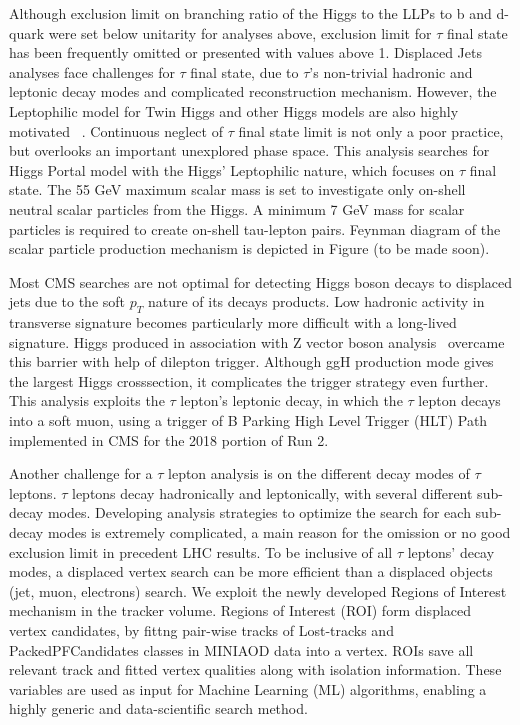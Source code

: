 Although exclusion limit on branching ratio of the Higgs to the LLPs to b and d-quark were set below unitarity for analyses above, exclusion limit for $\tau$ final state has been frequently omitted or presented with values above 1.  
Displaced Jets analyses face challenges for $\tau$ final state, due to $\tau$'s non-trivial hadronic and leptonic decay modes and complicated reconstruction mechanism. 
However, the Leptophilic model for Twin Higgs and other Higgs models are also highly motivated ~\cite{Lepto}. Continuous neglect of $\tau$ final state limit is not only a poor practice, but overlooks an important unexplored phase space. 
This analysis searches for Higgs Portal model with the Higgs' Leptophilic nature, which focuses on $\tau$ final state.
The 55 GeV maximum scalar mass is set to investigate only on-shell neutral scalar particles from the Higgs. 
A minimum 7 GeV mass for scalar particles is required to create on-shell tau-lepton pairs.
Feynman diagram of the scalar particle production mechanism is depicted in Figure (to be made soon).

Most CMS searches are not optimal for detecting Higgs boson decays to displaced jets
due to the soft $p_T$ nature of its decays products.
Low hadronic activity in transverse signature becomes particularly more difficult with a long-lived signature.
Higgs produced in association with Z vector boson analysis~\cite{ZHAN} overcame this barrier with help of dilepton trigger. 
Although ggH production mode gives the largest Higgs crosssection, it complicates the trigger strategy even further. 
This analysis exploits the $\tau$ lepton's leptonic decay, in which the $\tau$ lepton decays into a soft muon, using a trigger of B Parking High Level Trigger (HLT) Path implemented in CMS for the 2018 portion of Run 2.

Another challenge for a $\tau$ lepton analysis is on the different decay modes of $\tau$ leptons. 
$\tau$ leptons decay hadronically and leptonically, with several different sub-decay modes. 
Developing analysis strategies to optimize the search for each sub-decay modes is extremely complicated, a main reason for the omission or no good exclusion limit in precedent LHC results.
To be inclusive of all $\tau$ leptons' decay modes, a displaced vertex search can be more efficient than a displaced objects (jet, muon, electrons) search. 
We exploit the newly developed Regions of Interest mechanism in the tracker volume. 
Regions of Interest (ROI) form displaced vertex candidates, by fittng pair-wise tracks of Lost-tracks and PackedPFCandidates classes in MINIAOD data into a vertex. 
ROIs save all relevant track and fitted vertex qualities along with isolation information.
These variables are used as input for Machine Learning (ML) algorithms, enabling a highly generic and data-scientific search method.


